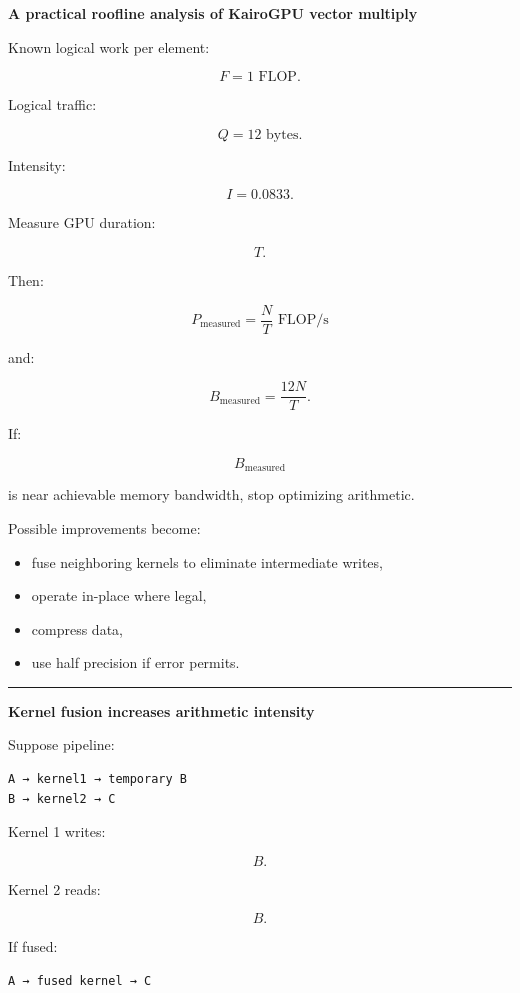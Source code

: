 \textbf{A practical roofline analysis of KairoGPU vector multiply}

Known logical work per element:

\[
F=1\text{ FLOP}.
\]

Logical traffic:

\[
Q=12\text{ bytes}.
\]

Intensity:

\[
I=0.0833.
\]

Measure GPU duration:

\[
T.
\]

Then:

\[
P_{\text{measured}}
=
\frac{
N
}{
T
}
\text{ FLOP/s}
\]

and:

\[
B_{\text{measured}}
=
\frac{
12N
}{
T
}
.
\]

If:

\[
B_{\text{measured}}
\]

is near achievable memory bandwidth, stop optimizing arithmetic.

Possible improvements become:

\begin{itemize}
\tightlist
\item
  fuse neighboring kernels to eliminate intermediate writes,
\item
  operate in-place where legal,
\item
  compress data,
\item
  use half precision if error permits.
\end{itemize}

\begin{center}\rule{0.5\linewidth}{0.5pt}\end{center}

\textbf{Kernel fusion increases arithmetic intensity}

Suppose pipeline:

\protect{}\label{p10-fusion-before}%
\begin{verbatim}
A → kernel1 → temporary B
B → kernel2 → C
\end{verbatim}

Kernel 1 writes:

\[
B.
\]

Kernel 2 reads:

\[
B.
\]

If fused:

\protect{}\label{p10-fusion-after}%
\begin{verbatim}
A → fused kernel → C
\end{verbatim}


